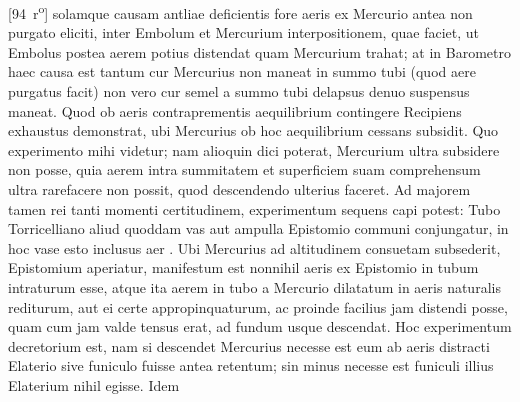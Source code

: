 [94~r\textsuperscript{o}] solamque causam antliae deficientis fore aeris ex Mercurio antea non purgato eliciti, inter Embolum et Mercurium interpositionem, quae faciet, ut Embolus postea aerem potius distendat quam Mercurium trahat; at in Barometro haec causa est tantum cur Mercurius non maneat in summo tubi (quod aere purgatus facit) non vero cur semel a summo tubi delapsus denuo suspensus maneat. Quod ob aeris contraprementis aequilibrium\protect{} contingere  Recipiens exhaustus demonstrat, ubi Mercurius\protect{} ob hoc   aequilibrium\protect{} cessans subsidit. Quo experimento   mihi  videtur;   nam alioquin dici poterat, Mercurium\protect{} ultra subsidere non   posse, quia aerem intra summitatem  et superficiem suam   comprehensum ultra rarefacere non possit, quod descendendo ulterius   faceret. Ad majorem tamen rei tanti momenti certitudinem,   experimentum sequens capi potest: Tubo Torricelliano\protect{}   aliud quoddam vas aut ampulla Epistomio\protect{} communi   conjungatur, in hoc vase esto inclusus aer  . Ubi  Mercurius\protect{} ad altitudinem   consuetam subsederit, Epistomium\protect{} aperiatur, manifestum est   nonnihil aeris ex Epistomio\protect{} in tubum intraturum esse,   atque ita aerem in tubo a Mercurio\protect{} dilatatum in  aeris naturalis rediturum, aut ei certe appropinquaturum, ac proinde facilius jam distendi posse, quam cum   jam valde tensus erat,  ad fundum usque descendat. Hoc experimentum   decretorium est, nam si descendet Mercurius\protect{} necesse est eum   ab aeris distracti Elaterio\protect{} sive funiculo\protect{} fuisse antea   retentum; sin minus necesse est funiculi\protect{} illius Elaterium\protect{}   nihil egisse. Idem 